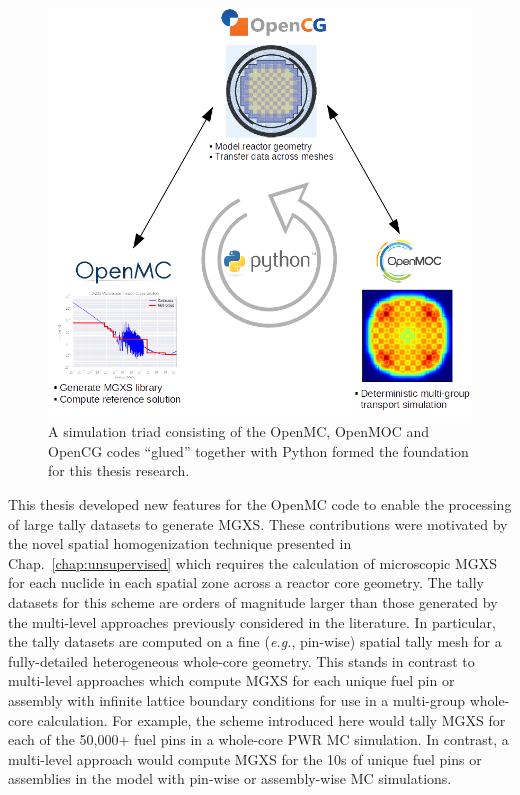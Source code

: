 \begin{figure}[h]
  \centering
  \includegraphics[width=0.8\linewidth]{figures/workflow/triad/simulation-triad}
\caption[A simulation triad of OpenMC, OpenMOC and OpenCG]{A simulation triad consisting of the OpenMC, OpenMOC and OpenCG codes ``glued'' together with Python formed the foundation for this thesis research.}
\label{fig:chap4-simulation-triad}
\end{figure}

This thesis developed new features for the OpenMC code to enable the processing of large tally datasets to generate \ac{MGXS}. These contributions were motivated by the novel spatial homogenization technique presented in Chap.~\ref{chap:unsupervised} which requires the calculation of microscopic \ac{MGXS} for each nuclide in each spatial zone across a reactor core geometry. The tally datasets for this scheme are orders of magnitude larger than those generated by the multi-level approaches previously considered in the literature. In particular, the tally datasets are computed on a fine (\textit{e.g.}, pin-wise) spatial tally mesh for a fully-detailed heterogeneous whole-core geometry. This stands in contrast to multi-level approaches which compute \ac{MGXS} for each unique fuel pin or assembly with infinite lattice boundary conditions for use in a multi-group whole-core calculation. For example, the scheme introduced here would tally \ac{MGXS} for each of the 50,000+ fuel pins in a whole-core \ac{PWR} \ac{MC} simulation. In contrast, a multi-level approach would compute \ac{MGXS} for the 10s of unique fuel pins or assemblies in the model with pin-wise or assembly-wise \ac{MC} simulations.

